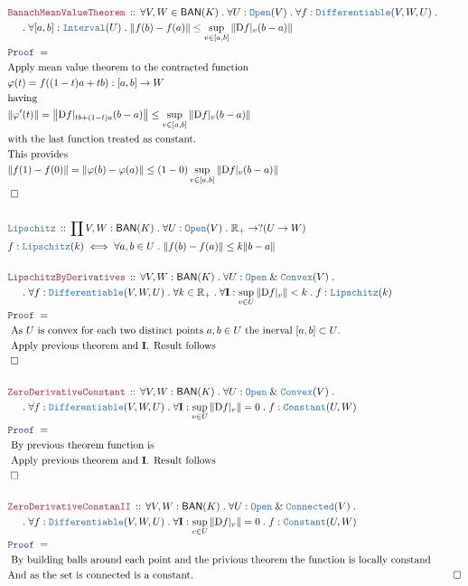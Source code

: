\documentclass[12pt]{scrartcl}
\newcommand{\TYPE}[1]{\textcolor{NavyBlue}{\mathtt{#1}}}
\newcommand{\LOGIC}[1]{\textcolor{Blue}{\mathtt{#1}}}
\newcommand{\THM}[1]{\textcolor{Maroon}{\mathtt{#1}}}
\renewcommand{\.}{\; . \;}
\newcommand{\Theorem}[2]{& \THM{#1} \, :: \, #2 \\ & \Proof = \\ }
\newcommand{\DeclareType}[2]{& \TYPE{#1} \, :: \, #2 \\}
\newcommand{\NewLine}{\\ & \kern 1pc}
\newcommand{\Page}[1]{\begin{align*} #1 \end{align*}   }
\renewcommand{\And}{\; \& \;}
\newcommand{\Reals}{\mathbb{R} }
\newcommand{\QED}{\; \square}
\newcommand{\EndProof}{& \QED \\}
\newcommand{\Proof}{\LOGIC{Proof} \; }
\newcommand{\BAN}{\mathsf{BAN}} %
\newcommand{\D}{\mathrm{D}}
\begin{document}
\Page{ 
	\Theorem{ BanachMeanValueTheorem  }
	{
		\forall V,W \in \BAN(K) \.
		\forall U : \TYPE{Open}(V) \.
		\forall f : \TYPE{Differentiable}(V,W,U) \. 
		\NewLine \.
		\forall  [a,b] : \TYPE{Interval}(U) \.
		\| f(b) - f(a) \| \le  \sup_{v \in [a,b]} \| \D f |_v (b - a) \|
	}
	& \textrm{Apply mean value theorem to the contracted function} \\
	& \varphi(t) = f( (1 -t)a + tb  ) : [a,b] \to W \\
	& \textrm{having} \\
	&  \| \varphi'(t)  \| =  \left\| \D f |_{tb + (1-t)a} (b - a) \right\| 
	 \le \sup_{v \in [a,b]} \left\| \D f |_{v} (b - a) \right\| \\
	& \textrm{with the last function treated as constant.} \\
	& \textrm{This provides} \\
	&  	\| f(1) - f(0) \| = 
		\| \varphi(b) - \varphi(a) \| \le
		 (1 - 0)\sup_{v \in [a,b]} \left\| \D f |_v (b-a)  \right\|  		 
	\\
	\EndProof
	\\
	\DeclareType{Lipschitz}{ \prod V,W : \BAN(K) \. \forall U : \TYPE{Open}(V) \. \Reals_{+} \to ?( U \to W )}
	& f : \TYPE{Lipschitz}(k) \iff  \forall a,b \in U \. \| f(b) - f(a) \| \le k\| b - a \| \\
	\\
	\Theorem{LipschitzByDerivatives}{
		\forall V,W : \BAN(K) \. \forall U : \TYPE{Open} \And \TYPE{Convex}(V) \. 
		\NewLine \.
		\forall f : \TYPE{Differentiable}(V,W,U) \.
		\forall k \in \Reals_+ \.
		\forall \mathbf{I} : \sup_{v \in U} \| \D f |_v \| < k \.
		f : \TYPE{Lipschitz}(k)
	}
	& \textrm{ As $U$ is convex for each two distinct points $a,b \in U$ the inerval $[a,b] \subset U$.} \\
	& \textrm{ Apply previous theorem and $\mathbf{I}$. Result follows  } \\
	\EndProof
	\\
	\Theorem{ZeroDerivativeConstant}{
		\forall V,W : \BAN(K) \. \forall U : \TYPE{Open} \And \TYPE{Convex}(V) \. 
		\NewLine \.
		\forall f : \TYPE{Differentiable}(V,W,U) \.
		\forall \mathbf{I} : \sup_{v \in U} \| \D f |_v \|  = 0 \.
		f : \TYPE{Constant}(U,W)
	}
	& \textrm{ By previous theorem function is} \\
	& \textrm{ Apply previous theorem and $\mathbf{I}$. Result follows  } \\
	\EndProof
	\\
	\Theorem{ZeroDerivativeConstanII}{
		\forall V,W : \BAN(K) \. \forall U : \TYPE{Open} \And \TYPE{Connected}(V) \. 
		\NewLine \.
		\forall f : \TYPE{Differentiable}(V,W,U) \.
		\forall \mathbf{I} : \sup_{v \in U} \| \D f |_v \|  = 0 \.
		f : \TYPE{Constant}(U,W)
	}
	& \textrm{ By building balls around each point and the privious theorem the function is locally constand} \\
	& \textrm{And as the set is connected is a constant.}
	\EndProof
}
\end{document}
